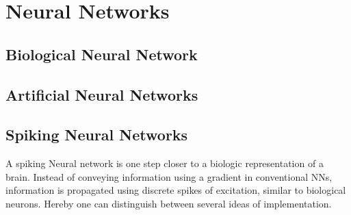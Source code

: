 \section{Neural Networks}

\subsection{Biological Neural Network}

\subsection{Artificial Neural Networks}
\subsection{Spiking Neural Networks}
A spiking Neural network is one step closer to a biologic representation of a brain. Instead of conveying information using a gradient in conventional \ac{NN}s, information is propagated using discrete spikes of excitation, similar to biological neurons. Hereby one can distinguish between several ideas of implementation.


